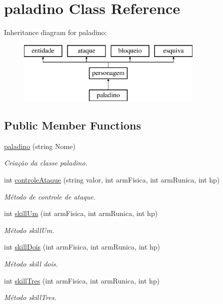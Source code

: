 \hypertarget{classpaladino}{}\section{paladino Class Reference}
\label{classpaladino}
Inheritance diagram for paladino\+:\begin{figure}[H]
\begin{center}
\leavevmode
\includegraphics[height=3.000000cm]{classpaladino}
\end{center}
\end{figure}
\subsection*{Public Member Functions}
\begin{DoxyCompactItemize}
\item 
\mbox{\hyperlink{classpaladino_a312e5f9a43967aa31e34128051646277}{paladino}} (string Nome)
\begin{DoxyCompactList}\small\item\em Criação da classe paladino. \end{DoxyCompactList}\item 
int \mbox{\hyperlink{classpaladino_a059fd05922c2adcbd87743b9c3552c11}{controle\+Ataque}} (string valor, int arm\+Fisica, int arm\+Runica, int hp)
\begin{DoxyCompactList}\small\item\em Método de controle de ataque. \end{DoxyCompactList}\item 
int \mbox{\hyperlink{classpaladino_aaf70250e226146bab3bb421b253483d5}{skill\+Um}} (int arm\+Fisica, int arm\+Runica, int hp)
\begin{DoxyCompactList}\small\item\em Método skill\+Um. \end{DoxyCompactList}\item 
int \mbox{\hyperlink{classpaladino_a62a3129268222902926377c6dd0dceb5}{skill\+Dois}} (int arm\+Fisica, int arm\+Runica, int hp)
\begin{DoxyCompactList}\small\item\em Método skill dois. \end{DoxyCompactList}\item 
int \mbox{\hyperlink{classpaladino_acd4e68058d2504c07989af88ace6d57b}{skill\+Tres}} (int arm\+Fisica, int arm\+Runica, int hp)
\begin{DoxyCompactList}\small\item\em Método skill\+Tres. \end{DoxyCompactList}\end{DoxyCompactItemize}


